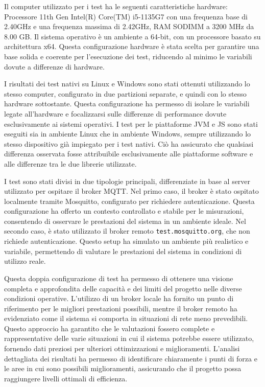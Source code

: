 \documentclass[12pt,a4paper,openright,twoside]{book}
\begin{document}
Il computer utilizzato per i test ha le seguenti caratteristiche hardware: Processore 11th Gen Intel(R) Core(TM) i5-1135G7 con una frequenza base di 2.40GHz e una 
frequenza massima di 2.42GHz, RAM SODIMM a 3200 MHz da 8.00 GB. Il sistema operativo è un ambiente a 64-bit, con un processore basato su architettura x64. 
Questa configurazione hardware è stata scelta per garantire una base solida e coerente per l'esecuzione dei test, riducendo al minimo le variabili dovute a differenze di hardware. 

I risultati dei test nativi su Linux e Windows sono stati ottenuti utilizzando lo stesso computer, configurato in due partizioni separate, e quindi con lo stesso hardware sottostante. 
Questa configurazione ha permesso di isolare le variabili legate all'hardware e focalizzarsi sulle differenze di performance dovute esclusivamente ai sistemi operativi. 
I test per le piattaforme JVM e JS sono stati eseguiti sia in ambiente Linux che in ambiente Windows, sempre utilizzando lo stesso dispositivo già impiegato per i test nativi. 
Ciò ha assicurato che qualsiasi differenza osservata fosse attribuibile esclusivamente alle piattaforme software e alle differenze tra le due librerie utilizzate.

I test sono stati divisi in due tipologie principali, differenziate in base al server utilizzato per ospitare il broker \ac{MQTT}. Nel primo caso, il broker è stato ospitato 
localmente tramite Mosquitto, configurato per richiedere autenticazione. Questa configurazione ha offerto un contesto controllato e stabile per le misurazioni, consentendo 
di osservare le prestazioni del sistema in un ambiente ideale. Nel secondo caso, è stato utilizzato il broker remoto \texttt{test.mosquitto.org}, che non richiede autenticazione. 
Questo setup ha simulato un ambiente più realistico e variabile, permettendo di valutare le prestazioni del sistema in condizioni di utilizzo reale.

Questa doppia configurazione di test ha permesso di ottenere una visione completa e approfondita delle capacità e dei limiti del progetto nelle diverse condizioni operative. 
L'utilizzo di un broker locale ha fornito un punto di riferimento per le migliori prestazioni possibili, mentre il broker remoto ha evidenziato come il sistema si comporta 
in situazioni di rete meno prevedibili. Questo approccio ha garantito che le valutazioni fossero complete e rappresentative delle varie situazioni in cui il sistema potrebbe 
essere utilizzato, fornendo dati preziosi per ulteriori ottimizzazioni e miglioramenti. L'analisi dettagliata dei risultati ha permesso di identificare chiaramente i 
punti di forza e le aree in cui sono possibili miglioramenti, assicurando che il progetto possa raggiungere livelli ottimali di efficienza.
\end{document}
